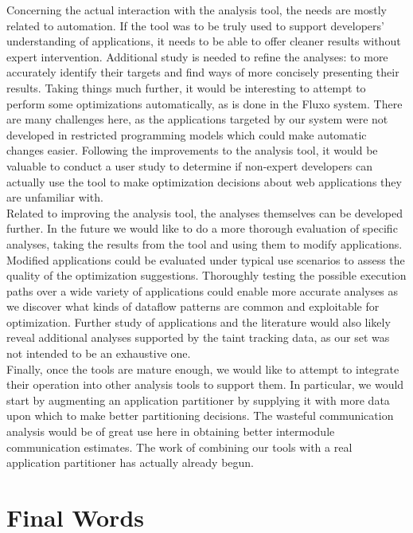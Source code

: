\documentclass[msc,oneside]{ubcthesis}
\begin{document}
Concerning the actual interaction with the analysis tool, the needs are mostly related to automation. If the tool was to be truly used to support developers' understanding of applications, it needs to be able to offer cleaner results without expert intervention. Additional study is needed to refine the analyses: to more accurately identify their targets and find ways of more concisely presenting their results. Taking things much further, it would be interesting to attempt to perform some optimizations automatically, as is done in the Fluxo system. There are many challenges here, as the applications targeted by our system were not developed in restricted programming models which could make automatic changes easier. Following the improvements to the analysis tool, it would be valuable to conduct a user study to determine if non-expert developers can actually use the tool to make optimization decisions about web applications they are unfamiliar with.\\

Related to improving the analysis tool, the analyses themselves can be developed further. In the future we would like to do a more thorough evaluation of specific analyses, taking the results from the tool and using them to modify applications. Modified applications could be evaluated under typical use scenarios to assess the quality of the optimization suggestions. Thoroughly testing the possible execution paths over a wide variety of applications could enable more accurate analyses as we discover what kinds of dataflow patterns are common and exploitable for optimization. Further study of applications and the literature would also likely reveal additional analyses supported by the taint tracking data, as our set was not intended to be an exhaustive one.\\

Finally, once the tools are mature enough, we would like to attempt to integrate their operation into other analysis tools to support them. In particular, we would start by augmenting an application partitioner by supplying it with more data upon which to make better partitioning decisions. The wasteful communication analysis would be of great use here in obtaining better intermodule communication estimates. The work of combining our tools with a real application partitioner has actually already begun.

\section{Final Words}
\end{document}

